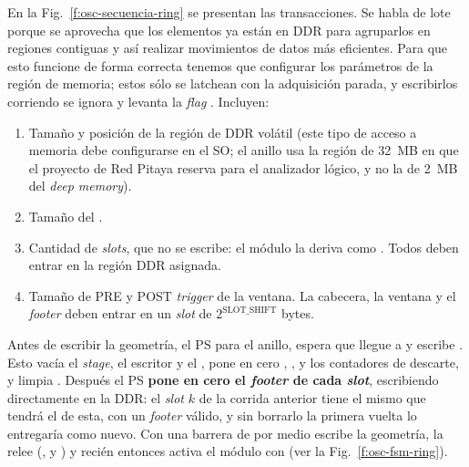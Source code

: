 En la Fig.~\ref{f:osc-secuencia-ring} se presentan las transacciones. Se habla
de lote porque se aprovecha que los elementos ya están en DDR para agruparlos en
regiones contiguas y así realizar movimientos de datos más eficientes. Para que
esto funcione de forma correcta tenemos que configurar los parámetros de la
región de memoria; estos sólo se latchean con la adquisición parada, y
escribirlos corriendo se ignora y levanta la \emph{flag} . Incluyen:
\begin{enumerate}
  \item Tamaño  y posición de la región de DDR volátil (este
    tipo de acceso a memoria debe configurarse en el SO; el anillo usa la región
    de 32~MB en  que el proyecto de Red Pitaya reserva para el
    analizador lógico, y no la de 2~MB del \emph{deep memory}).
  \item Tamaño del .
  \item Cantidad de \emph{slots}, que no se escribe: el módulo la deriva como
    . Todos
    deben entrar en la región DDR asignada.
  \item Tamaño de PRE y POST \emph{trigger} de la ventana. La cabecera, la ventana y el
    \emph{footer} deben entrar en un \emph{slot} de $2^\text{SLOT\_SHIFT}$ bytes.
\end{enumerate}
Antes de escribir la geometría, el PS para el anillo, espera que llegue a
 y escribe . Esto vacía el \emph{stage}, el escritor
y el , pone en cero , ,
 y los contadores de descarte, y limpia . Después
el PS \textbf{pone en cero el \emph{footer} de cada \emph{slot}}, escribiendo directamente en
la DDR: el \emph{slot} $k$ de la corrida anterior tiene el mismo  que
tendrá el de esta, con un \emph{footer} válido, y sin borrarlo la primera vuelta lo
entregaría como nuevo. Con una barrera de por medio escribe la geometría, la
relee (,  y ) y recién
entonces activa el módulo con  (ver la
Fig.~\ref{f:osc-fsm-ring}).

